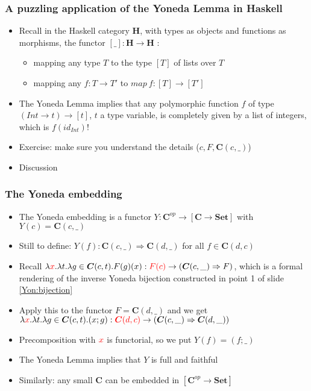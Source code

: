 \documentclass[handout]{beamer}
\newcommand{\To}{\Rightarrow}
\newcommand{\bfsf}[1]{{\boldsymbol{#1}}}
\newcommand{\Set}{\bfsf{Set}}
\newcommand{\CC}{\bfsf{C}}
\newcommand{\HH}{\bfsf{H}}
\begin{document}
\frame
  {   
    \frametitle{A puzzling application of the Yoneda Lemma in Haskell}\label{Yon:Hask}

 \begin{itemize}[<+->]
\item Recall in the Haskell category $\HH$, with types as objects and 
functions as morphisms, the functor $[\_]:\HH\to\HH$ :
   \begin{itemize}[<+->]
\item mapping any type $T$ to the type $[T]$ of lists over $T$
\item mapping any $f: T\to T'$ to $map~f: [T] \to [T']$
   \end{itemize}
\item The Yoneda Lemma implies that any polymorphic function
$f$ of type $(Int\to t) \to [t]$, $t$ a type variable,
is completely given by a list of integers, which is $f(id_{Int})$!
\item Exercise: make sure you understand the details ($c,F,\CC(c,\_)$) %
\item Discussion
 \end{itemize}

 }

\frame
  {   
    \frametitle{The Yoneda embedding}\label{Yon:Embed}

 \begin{itemize}[<+->]
\item The Yoneda embedding is a functor $Y: \CC^{op} \to [\CC\to\Set]$
with $Y(c)=\CC(c,\_)$
\item Still to define: $Y(f):\CC(c,\_)\To\CC(d,\_)$ for all $f\in\CC(d,c)$
\item Recall $\lambda {\color{red}x}.\lambda t. \lambda g\in\CC(c,t). F(g)(x) : {\color{red}F(c)} \to (\CC(c,\_)\To F)$,
which is a formal rendering of the inverse Yoneda bijection constructed in
point 1 of slide \ref{Yon:bijection}
\item Apply this to the functor $F= \CC(d,\_)$ and we get
$\lambda {\color{red}x}.\lambda t. \lambda g\in\CC(c,t). (x;g) : {\color{red}\CC(d,c)} \to (\CC(c,\_)\To \CC(d,\_))$
\item Precomposition with ${\color{red}x}$ is functorial, so we put $Y(f)= (f;\_)$
\item The Yoneda Lemma implies that $Y$ is full and faithful
\item Similarly: any small $\CC$ can be embedded in $[\CC^{op}\to\Set]$
 \end{itemize}

 }
\end{document}
